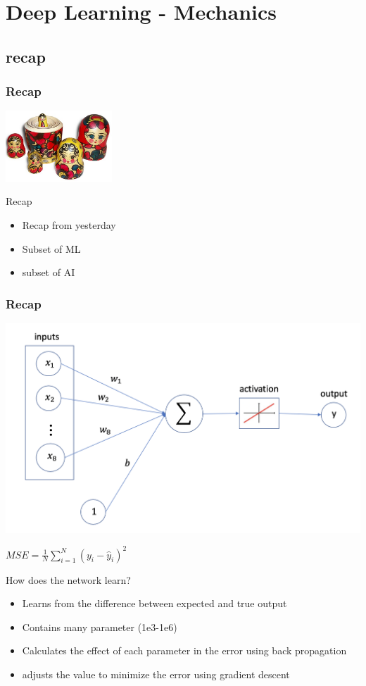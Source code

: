 \documentclass[aspectratio=169,usenames,dvipsnames]{beamer}
\begin{document}
\section{Deep Learning - Mechanics}
\subsection{recap}
\begin{frame}
    \frametitle{Recap}
    \centering
    \includegraphics[width=0.3\textwidth]{Figures/dl-nn-ml-ai.jpg}
    \begin{block}{Recap}
        \begin{itemize}
            \item Recap from yesterday
            \item Subset of ML
            \item subset of AI
        \end{itemize}
    \end{block}
\end{frame}
\begin{frame}
    \frametitle{Recap}
    \centering
    \begin{minipage}[c]{0.4\textwidth}
    \includegraphics[width=1\textwidth]{Figures/lin-reg.png}
    \end{minipage}
    $MSE=\frac{1}{N}\sum_{i=1}^N({y_i - \hat{y}_i})^2$
    \vspace{-1\baselineskip}
    \begin{block}{How does the network learn?}
        \begin{itemize}
            \item Learns from the difference between expected and true output
            \item Contains many parameter (1e3-1e6)
            \item Calculates the effect of each parameter in the error using back propagation
            \item adjusts the value to minimize the error using gradient descent
        \end{itemize}
    \end{block}
\end{frame}
\end{document}
